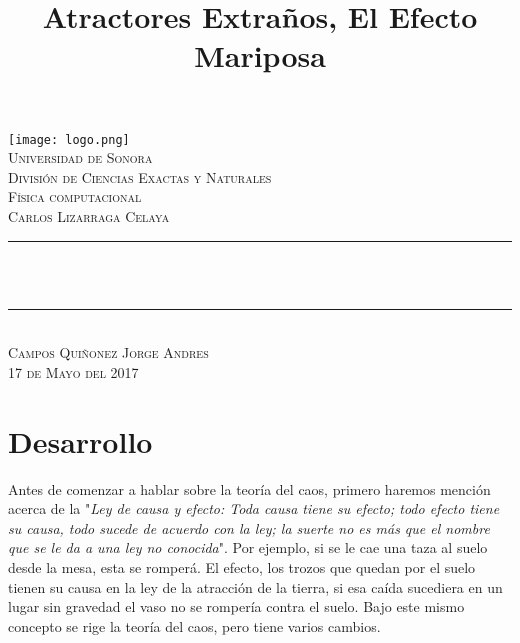 \documentclass{article}
\title{Atractores Extraños, El Efecto Mariposa}
\makeatletter
\let\thetitle\@title
\makeatother
\begin{document}
\begin{titlepage}
\centering
  \vspace*{0.5 cm}
   \texttt{[image: logo.png]}\\[0.5 cm]%
    \textsc{\LARGE Universidad de Sonora}\\[1.0 cm]	%
	\textsc{\LARGE División de Ciencias Exactas y Naturales}\\[0.5 cm]	
    
	\textsc{\LARGE Física computacional}\\
    \textsc{\Large Carlos Lizarraga Celaya}\\ [0.5 cm]
    \rule{\linewidth}{0.2 mm} \\[0.4 cm]
	{ \huge \bfseries \thetitle}\\
	\rule{\linewidth}{0.2 mm} \\[0.5 cm]
    \textsc{\Large Campos Quiñonez Jorge Andres} \\[0.25 cm]
   \textsc {\large 17 de Mayo del 2017} 	

	
 
	\vfill
	
\end{titlepage}
\pagebreak

\newpage

\pagebreak

\pagebreak
\onehalfspacing

\section*{\Large Desarrollo}
Antes de comenzar a hablar sobre la teoría del caos, primero haremos mención acerca de la "\textit{Ley de causa y efecto: Toda causa tiene su efecto; todo efecto tiene su causa, todo sucede de acuerdo con la ley; la suerte no es más que el nombre que se le da a una ley no conocida}". Por ejemplo, si se le cae una taza al suelo desde la mesa, esta se romperá. El efecto, los trozos que quedan por el suelo tienen su causa en la ley de la atracción de la tierra, si esa caída sucediera en un lugar sin gravedad el vaso no se rompería contra el suelo. Bajo este mismo concepto se rige la teoría del caos, pero tiene varios cambios.\\
\end{document}
